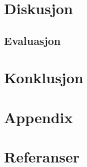 \documentclass[10pt]{article}
\begin{document}
{\section{Diskusjon}



\subsection{Evaluasjon}

\section{Konklusjon}

\newpage
\section{Appendix}
\section{Referanser}
\begingroup
\renewcommand{\section}[2]{}%


\endgroup



 
\end{document}
